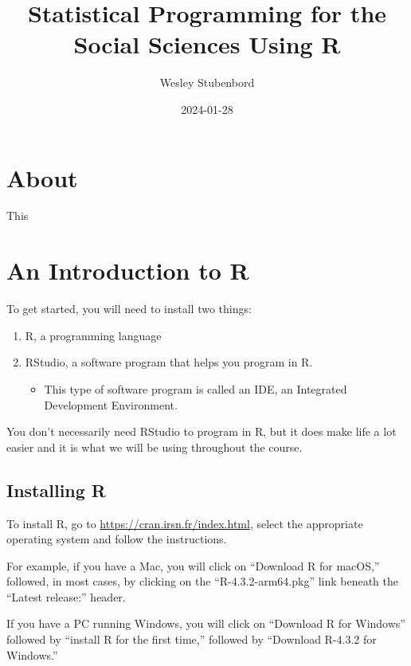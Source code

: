 \documentclass[
]{book}
\title{Statistical Programming for the Social Sciences Using R}
\author{Wesley Stubenbord}
\date{2024-01-28}
\providecommand{\tightlist}{%
  \setlength{\itemsep}{0pt}\setlength{\parskip}{0pt}}
\begin{document}
\maketitle

{
\setcounter{tocdepth}{1}
\tableofcontents
}
\hypertarget{about}{%
\chapter{About}\label{about}}

This

\hypertarget{an-introduction-to-r}{%
\chapter{An Introduction to R}\label{an-introduction-to-r}}

To get started, you will need to install two things:

\begin{enumerate}
\def\labelenumi{\arabic{enumi}.}
\item
  R, a programming language
\item
  RStudio, a software program that helps you program in R.

  \begin{itemize}
  \tightlist
  \item
    This type of software program is called an IDE, an Integrated Development Environment.
  \end{itemize}
\end{enumerate}

You don't necessarily need RStudio to program in R, but it does make life a lot easier and it is what we will be using throughout the course.

\hypertarget{installing-r}{%
\section{Installing R}\label{installing-r}}

To install R, go to \url{https://cran.irsn.fr/index.html}, select the appropriate operating system and follow the instructions.

For example, if you have a Mac, you will click on ``Download R for macOS,'' followed, in most cases, by clicking on the ``R-4.3.2-arm64.pkg'' link beneath the ``Latest release:'' header.

If you have a PC running Windows, you will click on ``Download R for Windows'' followed by ``install R for the first time,'' followed by ``Download R-4.3.2 for Windows.''
\end{document}
